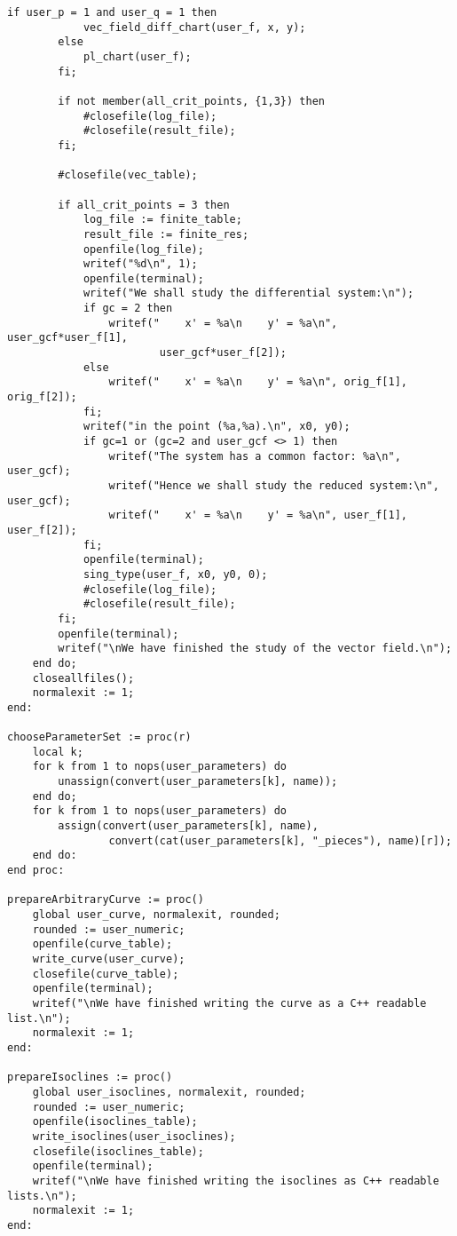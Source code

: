 \documentclass[a4paper,10pt]{article}
\begin{document}
\begin{lstlisting}[name=main]
        if user_p = 1 and user_q = 1 then
            vec_field_diff_chart(user_f, x, y);
        else
            pl_chart(user_f);
        fi;

        if not member(all_crit_points, {1,3}) then
            #closefile(log_file);
            #closefile(result_file);
        fi;

        #closefile(vec_table);

        if all_crit_points = 3 then
            log_file := finite_table;
            result_file := finite_res;
            openfile(log_file);
            writef("%d\n", 1);
            openfile(terminal);
            writef("We shall study the differential system:\n");
            if gc = 2 then
                writef("    x' = %a\n    y' = %a\n", user_gcf*user_f[1],
                        user_gcf*user_f[2]);
            else
                writef("    x' = %a\n    y' = %a\n", orig_f[1], orig_f[2]);
            fi;
            writef("in the point (%a,%a).\n", x0, y0);
            if gc=1 or (gc=2 and user_gcf <> 1) then
                writef("The system has a common factor: %a\n", user_gcf);
                writef("Hence we shall study the reduced system:\n", user_gcf);
                writef("    x' = %a\n    y' = %a\n", user_f[1], user_f[2]);
            fi;
            openfile(terminal);
            sing_type(user_f, x0, y0, 0);
            #closefile(log_file);
            #closefile(result_file);
        fi;
        openfile(terminal);
        writef("\nWe have finished the study of the vector field.\n");
    end do;
    closeallfiles();
    normalexit := 1;
end:

chooseParameterSet := proc(r)
    local k;
    for k from 1 to nops(user_parameters) do
        unassign(convert(user_parameters[k], name));
    end do;
    for k from 1 to nops(user_parameters) do
        assign(convert(user_parameters[k], name),
                convert(cat(user_parameters[k], "_pieces"), name)[r]);
    end do:
end proc:

prepareArbitraryCurve := proc()
    global user_curve, normalexit, rounded;
    rounded := user_numeric;
    openfile(curve_table);
    write_curve(user_curve);
    closefile(curve_table);
    openfile(terminal);
    writef("\nWe have finished writing the curve as a C++ readable list.\n");    
    normalexit := 1;
end:

prepareIsoclines := proc()
    global user_isoclines, normalexit, rounded;
    rounded := user_numeric;
    openfile(isoclines_table);
    write_isoclines(user_isoclines);
    closefile(isoclines_table);
    openfile(terminal);
    writef("\nWe have finished writing the isoclines as C++ readable lists.\n");
    normalexit := 1;
end:


\end{lstlisting}
\end{document}
